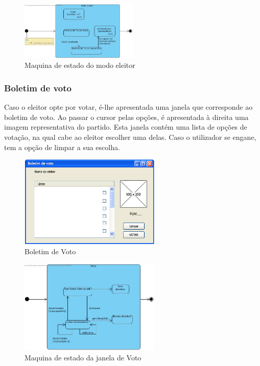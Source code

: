 \documentclass[a4paper,12pt]{report}
\begin{document}
\begin{figure}[h]
\begin{center}
	\includegraphics[width=0.5\textwidth]{media/MaqEst/m_modoEleitor.jpg}
	 \caption{Maquina de estado do modo eleitor}
\end{center}
\end{figure}

\newpage
\subsubsection{Boletim de voto}
Caso o eleitor opte por votar, é-lhe apresentada uma janela que corresponde ao boletim de voto. Ao passar o cursor pelas opções, é apresentada à direita uma imagem representativa do partido. Esta janela contém uma lista de opções de votação, na qual cabe ao eleitor escolher uma delas. Caso o utilizador se engane, tem a opção de limpar a sua escolha.

\begin{figure}[h]
\begin{center}
	\includegraphics[width=0.6\textwidth]{media/mockup/BoletimVoto.png}
	 \caption{Boletim de Voto}
\end{center}
\end{figure}

\begin{figure}[h]
\begin{center}
	\includegraphics[width=0.6\textwidth]{media/MaqEst/m_Votar.jpg}
	 \caption{Maquina de estado da janela de Voto}
\end{center}
\end{figure}
\end{document}
